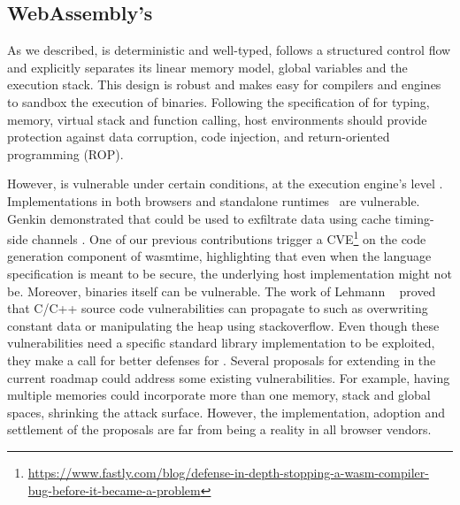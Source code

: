 

\subsection*{WebAssembly's }

As we described, \wasm is deterministic and well-typed, follows a structured control flow and explicitly separates its linear memory model, global variables and the execution stack. This design is robust \cite{WebAssemblySecurity} and makes easy for compilers and engines to sandbox the execution of binaries. Following the specification of for typing, memory, virtual stack and function calling,
host environments should provide protection against data corruption, code injection, and return-oriented programming (ROP).

However, is vulnerable under certain conditions, at the execution engine's level \cite{ChromeZero}.
Implementations in both browsers and standalone runtimes~\cite{Narayan2021Swivel} are vulnerable.
Genkin \etal demonstrated that could be used to exfiltrate data using cache timing-side channels \cite{Genkin2018DrivebyKC}.
One of our previous contributions trigger a CVE\footnote{\url{https://www.fastly.com/blog/defense-in-depth-stopping-a-wasm-compiler-bug-before-it-became-a-problem}} on the code generation component of wasmtime, highlighting that even when the language specification is meant to be secure, the underlying host implementation might not be. 
Moreover, binaries itself can be vulnerable. The work of Lehmann \etal ~\cite{usenixWasm2020} proved that C/C++ source code vulnerabilities can propagate to such as overwriting constant data or manipulating the heap using stackoverflow. Even though these vulnerabilities need a specific standard library implementation to be exploited, they make a call for better defenses for \wasm. 
Several proposals for extending \wasm in the current roadmap could address some existing vulnerabilities. For example, having multiple memories could incorporate more than one memory, stack and global spaces, shrinking the attack surface. However, the implementation, adoption and settlement of the proposals are far from being a reality in all browser vendors.


